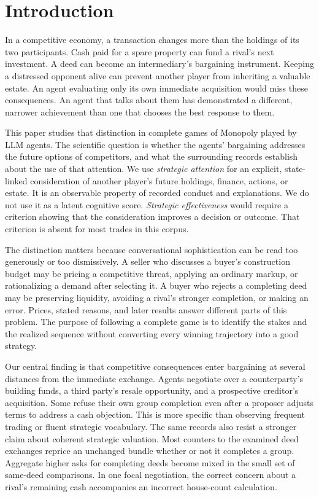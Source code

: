 \section{Introduction}

In a competitive economy, a transaction changes more than the holdings of its two participants. Cash paid for a spare property can fund a rival's next investment. A deed can become an intermediary's bargaining instrument. Keeping a distressed opponent alive can prevent another player from inheriting a valuable estate. An agent evaluating only its own immediate acquisition would miss these consequences. An agent that talks about them has demonstrated a different, narrower achievement than one that chooses the best response to them.

This paper studies that distinction in complete games of Monopoly played by LLM agents. The scientific question is whether the agents' bargaining addresses the future options of competitors, and what the surrounding records establish about the use of that attention. We use \emph{strategic attention} for an explicit, state-linked consideration of another player's future holdings, finance, actions, or estate. It is an observable property of recorded conduct and explanations. We do not use it as a latent cognitive score. \emph{Strategic effectiveness} would require a criterion showing that the consideration improves a decision or outcome. That criterion is absent for most trades in this corpus.

The distinction matters because conversational sophistication can be read too generously or too dismissively. A seller who discusses a buyer's construction budget may be pricing a competitive threat, applying an ordinary markup, or rationalizing a demand after selecting it. A buyer who rejects a completing deed may be preserving liquidity, avoiding a rival's stronger completion, or making an error. Prices, stated reasons, and later results answer different parts of this problem. The purpose of following a complete game is to identify the stakes and the realized sequence without converting every winning trajectory into a good strategy.

Our central finding is that competitive consequences enter bargaining at several distances from the immediate exchange. Agents negotiate over a counterparty's building funds, a third party's resale opportunity, and a prospective creditor's acquisition. Some refuse their own group completion even after a proposer adjusts terms to address a cash objection. This is more specific than observing frequent trading or fluent strategic vocabulary. The same records also resist a stronger claim about coherent strategic valuation. Most counters to the examined deed exchanges reprice an unchanged bundle whether or not it completes a group. Aggregate higher asks for completing deeds become mixed in the small set of same-deed comparisons. In one focal negotiation, the correct concern about a rival's remaining cash accompanies an incorrect house-count calculation.

